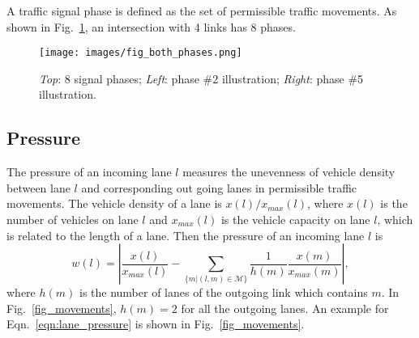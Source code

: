 A traffic signal phase is defined as the set of permissible traffic movements. 
As shown in Fig.~\ref{fig_phases}, an intersection with 4 links has 8 phases.
  \begin{figure}[t]
    \texttt{[image: images/fig\_both\_phases.png]}
    \centering
  \caption{\emph{Top}: 8 signal phases; \emph{Left}: phase \#2 illustration; \emph{Right}: phase \#5 illustration.
  }
  \label{fig_phases}
  \end{figure}
%
%
\subsection{Pressure}
The pressure of an incoming lane $l$ measures the unevenness of vehicle density between lane $l$ and corresponding out going lanes in permissible traffic movements. The vehicle density of a lane is $x(l)/x_{max}(l)$, where $x(l)$ is the number of vehicles on lane $l$ and $x_{max}(l)$ is the vehicle capacity on lane $l$, which is related to the length of a lane. Then the pressure of an incoming lane $l$ is 
\begin{equation} 
    w(l) = \left|\frac{x(l)}{x_{max}(l)} - \sum_{\{m|(l, m)\in \mathcal{M}\}}\frac{1}{h(m)}\frac{x(m)}{x_{max}(m)}\right|,
    \label{eqn:lane_pressure}
\end{equation}
where $h(m)$ is the number of lanes of the outgoing link which contains $m$. In Fig.~\ref{fig_movements}, $h(m)=2$ for all the outgoing lanes. An example for Eqn.~\eqref{eqn:lane_pressure} is shown in Fig.~\ref{fig_movements}.

